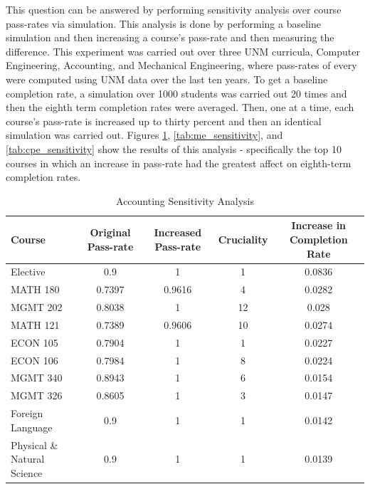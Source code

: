 \documentclass[botnum, fleqn]{unmeethesis}
\begin{document}
    This question can be answered by performing sensitivity analysis over course pass-rates via simulation. This analysis is done by performing a baseline simulation and then increasing a course's pass-rate and then measuring the difference. This experiment was carried out over three UNM curricula, Computer Engineering, Accounting, and Mechanical Engineering, where pass-rates of every were computed using UNM data over the last ten years. To get a baseline completion rate, a simulation over 1000 students was carried out 20 times and then the eighth term completion rates were averaged. Then, one at a time, each course's pass-rate is increased up to thirty percent and then an identical simulation was carried out. Figures \ref{tab:accounting_sensitivity}, \ref{tab:me_sensitivity}, and \ref{tab:cpe_sensitivity} show the results of this analysis - specifically the top 10 courses in which an increase in pass-rate had the greatest affect on eighth-term completion rates.

    \begin{table}[!h]
    \tiny
    \begin{tabular}{l*{4}{c}}
    Course & Original Pass-rate & Increased Pass-rate & Cruciality & Increase in Completion Rate \\
    \hline
    Elective & 0.9 & 1 & 1 & 0.0836 \\
    MATH 180 & 0.7397 & 0.9616 & 4 & 0.0282 \\
    MGMT 202 & 0.8038 & 1 & 12 & 0.028 \\
    MATH 121 & 0.7389 & 0.9606 & 10 & 0.0274 \\
    ECON 105 & 0.7904 & 1 & 1 & 0.0227 \\
    ECON 106 & 0.7984 & 1 & 8 & 0.0224 \\
    MGMT 340 & 0.8943 & 1 & 6 & 0.0154 \\
    MGMT 326 & 0.8605 & 1 & 3 & 0.0147 \\
    Foreign Language & 0.9 & 1 & 1 & 0.0142 \\
    Physical \& Natural Science & 0.9 & 1 & 1 & 0.0139 \\
    \end{tabular}
    \caption{Accounting Sensitivity Analysis} 
    \label{tab:accounting_sensitivity}
    \end{table}
\end{document}
